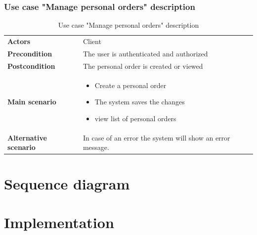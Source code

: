 \documentclass[12pt,a4paper]{report}
\begin{document}
		\subsubsection*{Use case "Manage personal orders" description}
		\begin{table}[H]
			\begin{center}
				\captionsetup[table]{skip=10pt}
				\caption{Use case "Manage personal orders" description}
				\setlength\doublerulesep{0.5pt}
				\begin{tabular}{|  p{5cm}|  p{9cm}|}
					\rowcolor{LightCyan}
					
					\hline
					\multicolumn{2}{c}{Use case "Manage personal orders"}\\
					\hline
					
					\textbf{Actors} &                        
					Client 
					\\ \hline
					
					\textbf{Precondition} &                        
					The user is authenticated and authorized
					\\ \hline
					\textbf{Postcondition} &                        
					The personal order is created or viewed
					\\ \hline
					
					\textbf{Main scenario} &                   
					\begin{itemize}
						\item Create a personal order
						\item The system saves the changes
						\item view list of personal orders
						
					\end{itemize}
					
					
					\\ \hline
					
					\textbf{Alternative scenario} &                        
					In case of an error the system will show an error message.
					\\ \hline
					
					
				\end{tabular}
				
			\end{center}
			
		\end{table}
\section{Sequence diagram}
	\section{Implementation}
\end{document}
